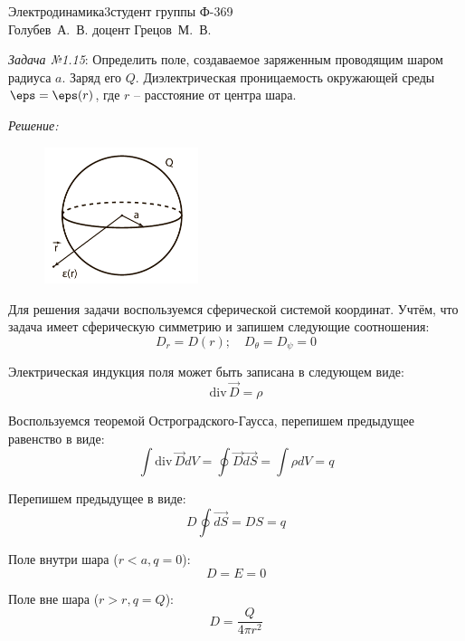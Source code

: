 



\usepackage{wrapfig}


{Электродинамика}{3}{}{студент группы Ф-369\\Голубев~А.~В.}
{}{доцент Грецов~М.~В.}{}{}

\newcommand{\grad}{\mathrm{grad}\,}
\renewcommand{\div}{\mathrm{div}\,}
\newcommand{\rot}{\mathrm{rot}\,}

\newpage

\emph{Задача №1.15}: Определить поле, создаваемое заряженным проводящим шаром 
радиуса \( a \). Заряд его \( Q \). Диэлектрическая проницаемость окружающей 
среды \( \eps = \eps(r) \), где \( r \) -- расстояние от центра шара.

\emph{Решение:} 

\begin{figure}
	\vspace{-2ex}
	\includegraphics[width=0.4\textwidth]{pdf/image_1_15}
\end{figure}

Для решения задачи воспользуемся сферической системой координат. Учтём, что 
задача имеет сферическую симметрию и запишем следующие соотношения:
\[
	D_r = D(r);\quad
	D_\theta = D_\psi = 0
\]

Электрическая индукция поля может быть записана в следующем виде:
\[
	\div{\vec{D}} = \rho
\]

Воспользуемся теоремой Остроградского-Гаусса, перепишем предыдущее равенство 
в виде:
\[
	\int \div\vec{D} dV = \oint \vec{D}\vec{dS} = \int \rho dV = q
\]

Перепишем предыдущее в виде:
\[
	D \oint\vec{dS} = DS = q
\]

Поле внутри шара (\( r < a, q = 0 \)):
\[
	D = E = 0
\]

Поле вне шара (\( r > r, q = Q \)):
\[
	D = \frac{Q}{4\pi r^2}
\]

